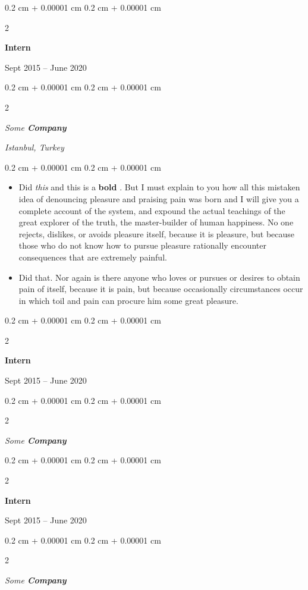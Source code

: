 \documentclass[10pt, letterpaper]{article}
\newenvironment{highlights}{
    \begin{itemize}[
        topsep=0.10 cm,
        parsep=0.10 cm,
        partopsep=0pt,
        itemsep=0pt,
        leftmargin=0.4 cm + 10pt
    ]
}{
    \end{itemize}
} %
\newenvironment{onecolentry}{
    \begin{adjustwidth}{
        0.2 cm + 0.00001 cm
    }{
        0.2 cm + 0.00001 cm
    }
}{
    \end{adjustwidth}
} %
\newenvironment{twocolentry}[2][]{
    \onecolentry
    \def\secondColumn{#2}
    \setcolumnwidth{\fill, 4.5 cm}
    \begin{paracol}{2}
}{
    \switchcolumn \raggedleft \secondColumn
    \end{paracol}
    \endonecolentry
} %
\let\hrefWithoutArrow\href
\renewcommand{\href}[2]{\hrefWithoutArrow{#1}{\ifthenelse{\equal{#2}{}}{ }{#2 }\raisebox{.15ex}{\footnotesize \faExternalLink*}}}
\begin{document}
                \begin{twocolentry}{
                    Sept 2015 – June 2020
                }
                \textbf{Intern}
                \end{twocolentry}
            \begin{twocolentry}{
        \textit{Istanbul, Turkey}    }
            \textit{Some \textbf{Company}}
            \end{twocolentry}

        \vspace{0.10 cm}
        \begin{onecolentry}
            \begin{highlights}
                \item Did \textit{this} and this is a \textbf{bold} \href{https://example.com}{link}. But I must explain to you how all this mistaken idea of denouncing pleasure and praising pain was born and I will give you a complete account of the system, and expound the actual teachings of the great explorer of the truth, the master-builder of human happiness. No one rejects, dislikes, or avoids pleasure itself, because it is pleasure, but because those who do not know how to pursue pleasure rationally encounter consequences that are extremely painful.
                \item Did that. Nor again is there anyone who loves or pursues or desires to obtain pain of itself, because it is pain, but because occasionally circumstances occur in which toil and pain can procure him some great pleasure.
            \end{highlights}
        \end{onecolentry}


        \vspace{0.2 cm}

                \begin{twocolentry}{
                    Sept 2015 – June 2020
                }
                \textbf{Intern}
                \end{twocolentry}
            \begin{twocolentry}{
            }
            \textit{Some \textbf{Company}}
            \end{twocolentry}



        \vspace{0.2 cm}

                \begin{twocolentry}{
                    Sept 2015 – June 2020
                }
                \textbf{Intern}
                \end{twocolentry}
            \begin{twocolentry}{
            }
            \textit{Some \textbf{Company}}
            \end{twocolentry}
\end{document}
